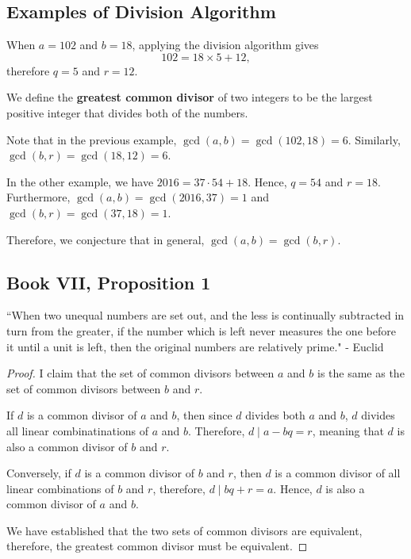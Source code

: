 \clearpage

\subsection*{Examples of Division Algorithm}

When $a=102$ and $b=18$, applying the division algorithm gives $$102=18\times 5+12,$$ therefore $q=5$ and $r=12$. 

\clearpage


\begin{defi}  We define the \textbf{greatest common divisor} of two integers to be the largest positive integer that divides both of the numbers.  \end{defi}

Note that in the previous example, $\gcd(a,b)=\gcd(102, 18)=6$. Similarly, $\gcd(b, r)=\gcd(18, 12)=6$. 

In the other example, we have $2016=37\cdot 54+18$. Hence, $q=54$ and $r=18$. Furthermore, $\gcd(a,b)=\gcd(2016, 37)=1$ and $\gcd(b,r)=\gcd(37, 18)=1$. 

Therefore, we conjecture that in general, $\gcd(a,b)=\gcd(b,r).$ 
\clearpage

\subsection{Book VII, Proposition 1}

``When two unequal numbers are set out, and the less is continually subtracted in turn from the greater, if the number which is left never measures the one before it until a unit is left, then the original numbers are relatively prime." - Euclid  


\clearpage

\begin{proof}

I claim that the set of common divisors between $a$ and $b$ is the same as the set of common divisors between $b$ and $r$.  

If $d$ is a common divisor of $a$ and $b$, then since $d$ divides both $a$ and $b$, $d$ divides all linear combinatinations of $a$ and $b$.  Therefore, $d\mid a-bq=r$, meaning that $d$ is also a common divisor of $b$ and $r$.  

Conversely, if $d$ is a common divisor of $b$ and $r$, then $d$ is a common divisor of all linear combinations of $b$ and $r$, therefore, $d\mid bq+r=a$.  Hence, $d$ is also a common divisor of $a$ and $b$.  

We have established that the two sets of common divisors are equivalent, therefore, the greatest common divisor must be equivalent.  \end{proof}

